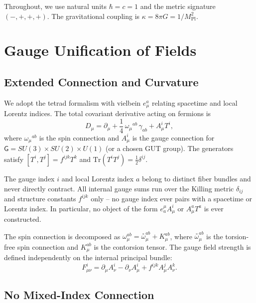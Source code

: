 \documentclass[twocolumn,prd,amsmath,amssymb]{revtex4-2}
\newcommand{\Pl}{M_{\text{Pl}}}
\begin{document}
Throughout, we use natural units $\hbar = c = 1$ and the metric signature $(-,+,+,+)$.
The gravitational coupling is $\kappa = 8\pi G = 1/\Pl^2$.

\section{Gauge Unification of Fields}
\label{sec:gauge}

\subsection{Extended Connection and Curvature}

We adopt the tetrad formalism with vielbein $e^{a}_{\mu}$ relating spacetime and local
Lorentz indices.  The total covariant derivative acting on fermions is
\begin{equation}
D_{\mu}=\partial_{\mu}+\frac14\,\omega_{\mu}{}^{ab}\,\gamma_{ab}+A_{\mu}^{i}T^{i},
\label{eq:cov-der}
\end{equation}
where $\omega_{\mu}{}^{ab}$ is the spin connection and $A_{\mu}^{i}$ is the gauge
connection for $\mathsf{G}=SU(3)\times SU(2)\times U(1)$ (or a chosen GUT group).
The generators satisfy $[T^{i},T^{j}]=f^{ijk}T^{k}$ and
$\mathrm{Tr}(T^{i}T^{j})=\frac12\delta^{ij}$.

The gauge index $i$ and local Lorentz index $a$ belong to distinct fiber bundles and
never directly contract.  All internal gauge sums run over the Killing metric $\delta_{ij}$
and structure constants $f^{ijk}$ only -- no gauge index ever pairs with a spacetime or
Lorentz index.  In particular, no object of the form $e^{\mu}_{a}A_{\mu}^{i}$ or
$A^{a}_{\mu}T^{a}$ is ever constructed.

The spin connection is decomposed as
$\omega_{\mu}^{ab}=\overset{\circ}{\omega}_{\mu}^{ab}+K_{\mu}^{ab}$, where
$\overset{\circ}{\omega}_{\mu}^{ab}$ is the torsion-free spin connection and
$K_{\mu}^{ab}$ is the contorsion tensor.  The gauge field strength is defined
independently on the internal principal bundle:
\begin{equation}
F^{i}_{\mu\nu}=\partial_{\mu}A^{i}_{\nu}-\partial_{\nu}A^{i}_{\mu}+f^{ijk}A^{j}_{\mu}A^{k}_{\nu}.
\label{eq:ym-fs}
\end{equation}

\subsection{No Mixed-Index Connection}
\end{document}
